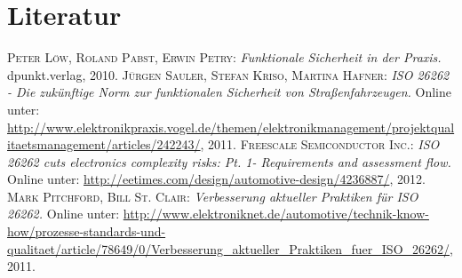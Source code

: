 \documentclass[]{beamer}
\begin{document}
\section*{Literatur}
\label{sec:Literatur}

\begin{frame}
\begin{thebibliography}{------}

 \textsc{Peter Löw, Roland Pabst, Erwin Petry}: {\em Funktionale Sicherheit in der Praxis.} dpunkt.verlag, 2010.
 \textsc{Jürgen Sauler, Stefan Kriso, Martina Hafner}: {\em ISO 26262 - Die zukünftige Norm zur funktionalen Sicherheit von Straßenfahrzeugen.} Online unter: \url{http://www.elektronikpraxis.vogel.de/themen/elektronikmanagement/projektqualitaetsmanagement/articles/242243/}, 2011.
 \textsc{Freescale Semiconductor Inc.}: {\em ISO 26262 cuts electronics complexity risks: Pt. 1- Requirements and assessment flow.} Online unter: \url{http://eetimes.com/design/automotive-design/4236887/}, 2012.
 \textsc{Mark Pitchford, Bill St. Clair}: {\em Verbesserung aktueller Praktiken für ISO 26262.} Online unter: \url{http://www.elektroniknet.de/automotive/technik-know-how/prozesse-standards-und-qualitaet/article/78649/0/Verbesserung_aktueller_Praktiken_fuer_ISO_26262/}, 2011.

\end{thebibliography}

\end{frame}
\end{document}
